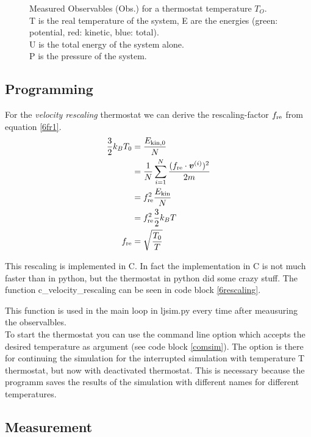 \begin{figure}[ht]
\caption{
Measured Observables (Obs.) for a thermostat temperature $T_O$.\\
T is the real temperature of the system, E are the energies (green: potential, red: kinetic, blue: total).\\
U is the total energy of the system alone.\\
P is the pressure of the system.}
\label{fig4}
\end{figure}

\subsection*{Programming}

For the \emph{velocity rescaling} thermostat we can derive the rescaling-factor $f_\text{re}$ from equation \eqref{6fr1}.
\begin{align}
\frac{3}{2}k_BT_0
	&= \frac{E_{\text{kin},0}}{N}
	\label{6fr1}\\
&= \frac{1}{N}\sum_{i=1}^{N} \frac{(f_\text{re}\cdot\boldsymbol{v}^{(i)})^2}{2m}
	\label{6fr2}\\
&= f_\text{re}^2\frac{E_\text{kin}}{N}
	\label{6fr3}\\
&=f_\text{re}^2\frac{3}{2}k_BT
	\label{6fr4}\\
f_\text{re}
	&= \sqrt{\frac{T_0}{T}}
	\label{6r5}
\end{align}

This rescaling is implemented in C. In fact the implementation in C is not much faster than in python, but the thermostat in python did some crazy stuff.
The function c\_velocity\_rescaling can be seen in code block \ref{6rescaling}.


This function is used in the main loop in ljsim.py every time after meausuring the observalbles.\\

To start the thermostat you can use the command line option  which accepts the desired temperature as argument (see code block \ref{comsim}).
The option  is there for continuing the simulation for the interrupted simulation with temperature T thermostat, but now with deactivated thermostat.
This is necessary because the programm saves the results of the simulation with different names for different temperatures.

\subsection*{Measurement}

